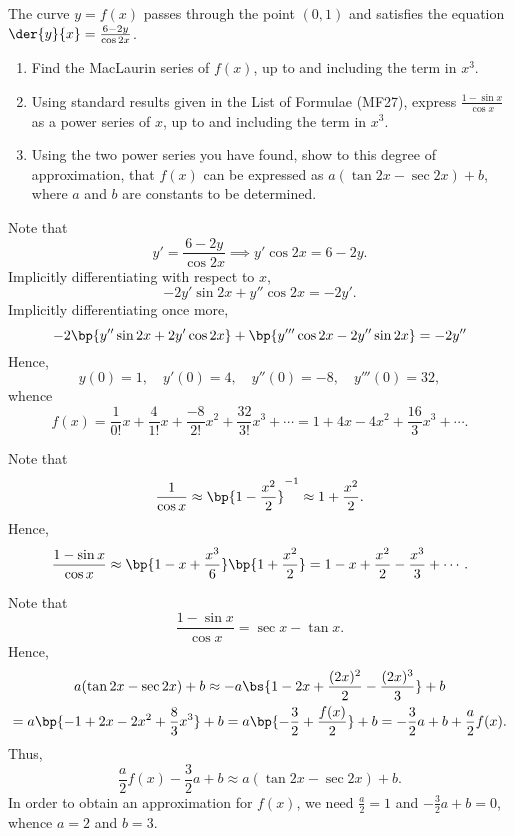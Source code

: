 \begin{problem}
    The curve $y = f(x)$ passes through the point $(0, 1)$ and satisfies the equation $\der{y}{x} = \frac{6-2y}{\cos 2x}$.
        
    \begin{enumerate}
        \item Find the MacLaurin series of $f(x)$, up to and including the term in $x^3$.
        \item Using standard results given in the List of Formulae (MF27), express $\frac{1-\sin x}{\cos x}$ as a power series of $x$, up to and including the term in $x^3$.
        \item Using the two power series you have found, show to this degree of approximation, that $f(x)$ can be expressed as $a(\tan 2x - \sec 2x) + b$, where $a$ and $b$ are constants to be determined.
    \end{enumerate}
\end{problem}
\clearpage
\begin{solution}
    \begin{ppart}
        Note that \[y' = \frac{6-2y}{\cos 2x} \implies y' \cos 2x = 6-2y.\] Implicitly differentiating with respect to $x$, \[-2y'\sin 2x + y'' \cos 2x = -2 y'.\] Implicitly differentiating once more, \[-2\bp{y'' \sin 2x + 2 y' \cos 2x} + \bp{y''' \cos 2x -2 y'' \sin 2x} = -2y''\] Hence, \[y(0) = 1, \quad y'(0) = 4, \quad y''(0) = -8, \quad y'''(0) = 32,\] whence \[f(x) = \frac{1}{0!} x + \frac{4}{1!} x + \frac{-8}{2!} x^2 + \frac{32}{3!} x^3 + \cdots = 1 + 4x -4x^2 + \frac{16}3 x^3 + \cdots.\]
    \end{ppart}
    \begin{ppart}
        Note that \[\frac1{\cos x} \approx \bp{1 - \frac{x^2}{2}}^{-1} \approx 1 + \frac{x^2}{2}.\] Hence, \[\frac{1-\sin x}{\cos x} \approx \bp{1 - x + \frac{x^3}6}\bp{1 + \frac{x^2}{2}} = 1 - x + \frac{x^2}2 - \frac{x^3}3 + \cdots.\]
    \end{ppart}
    \begin{ppart}
        Note that \[\frac{1 - \sin x}{\cos x} = \sec x - \tan x.\] Hence,
        \begin{gather*}
            a(\tan 2x - \sec 2x) + b \approx -a \bs{ 1 - 2x + \frac{(2x)^2}2 - \frac{(2x)^3}3} + b \\
            = a \bp{-1 + 2x - 2x^2 + \frac83 x^3} + b = a \bp{-\frac32 + \frac{f(x)}2} + b = -\frac32 a + b + \frac{a}2 f(x).
        \end{gather*}
        Thus, \[\frac{a}2 f(x) - \frac32 a + b \approx a(\tan 2x - \sec 2x) + b.\] In order to obtain an approximation for $f(x)$, we need $\frac{a}2 = 1$ and $-\frac32 a + b = 0$, whence $a = 2$ and $b = 3$.
    \end{ppart}
\end{solution}

